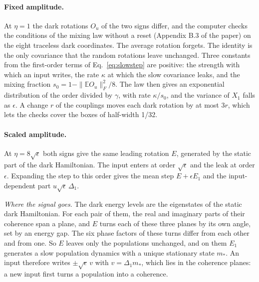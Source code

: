 \documentclass[a4paper,11pt]{article}
\begin{document}
\paragraph{Fixed amplitude.}
At $\eta=1$ the dark rotations $O_u$ of the two signs differ, and the computer checks the conditions of the mixing law
without a reset (Appendix B.3 of the paper) on the eight traceless dark coordinates. The average rotation forgets. The identity is the only covariance that the random rotations leave unchanged. Three constants from the first-order terms of
Eq.~\eqref{eq:slowstep} are positive: the strength with which an input writes, the rate $\kappa$ at which the slow
covariance leaks, and the mixing fraction $s_0=1-\|\mathbb EO_u\|_F^2/8$. The law then gives an exponential
distribution of the order divided by $\gamma$, with rate $\kappa/s_0$, and the variance of
$X_1$ falls as $\epsilon$. A change $r$ of the couplings moves each dark rotation by at most $3r$, which lets the
checks cover the boxes of half-width 1/32.

\paragraph{Scaled amplitude.}
At $\eta=8\sqrt\epsilon$ both signs give the same leading rotation $E$, generated by the static part of the dark
Hamiltonian. The input enters at order $\sqrt\epsilon$ and the leak at order $\epsilon$. Expanding the step to this order
gives the mean step $E+\epsilon E_1$ and the input-dependent part $u\sqrt\epsilon\,\Delta_1$.

\emph{Where the signal goes.} The dark energy levels are the eigenstates of the static dark Hamiltonian. For each
pair of them, the real and imaginary parts of their coherence span a plane, and $E$ turns each of these three planes by
its own angle, set by an energy gap. The six phase factors of these turns differ from each other and from one.
So $E$ leaves only the populations unchanged, and on them $E_1$ generates a slow population dynamics with a unique stationary state
$m_*$. An input therefore writes $\pm\sqrt\epsilon\,v$ with $v=\Delta_1m_*$, which lies in the coherence planes: a new
input first turns a population into a coherence.
\end{document}
